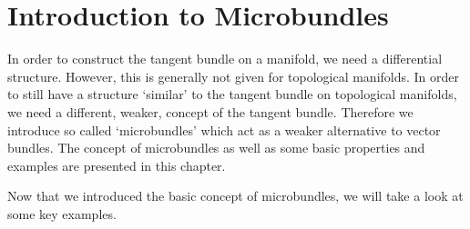 \chapter{Introduction to Microbundles}\label{chapter::microbundle}
\begin{myparagraph}
    In order to construct the tangent bundle on a manifold, we need a differential structure.
    However, this is generally not given for topological manifolds.
    In order to still have a structure `similar' to the tangent bundle on topological manifolds,
    we need a different, weaker, concept of the tangent bundle.
    Therefore we introduce so called `microbundles' which act as a weaker alternative to vector bundles.
    The concept of microbundles as well as some basic properties and examples are presented in this chapter.
\end{myparagraph}



\begin{myparagraph}
    Now that we introduced the basic concept of microbundles, we will take a look at some key examples.
\end{myparagraph}


